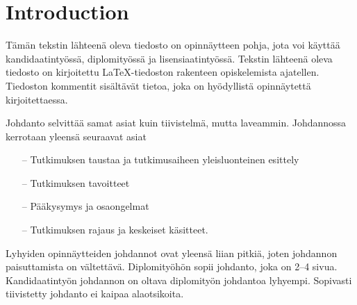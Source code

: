 \documentclass[english,12pt,a4paper,dvips]{article}
\begin{document}
\section{Introduction}

\thispagestyle{empty}

Tämän tekstin lähteenä oleva tiedosto on opinnäytteen
pohja, jota voi käyttää kandidaatintyössä, diplomityössä ja
lisensiaatintyössä. Tekstin 
lähteenä oleva tiedosto on kirjoitettu  \LaTeX-tiedoston rakenteen
opiskelemista ajatellen. Tiedoston kommentit sisältävät
tietoa, joka on hyödyllistä opinnäytettä kirjoitettaessa. 

Johdanto selvittää samat asiat kuin tiivistelmä, mutta
laveammin. Johdannossa kerrotaan yleensä seuraavat asiat

\begin{itemize}
\item[--]Tutkimuksen taustaa ja tutkimusaiheen yleisluonteinen esittely
\item[--]Tutkimuksen tavoitteet
\item[--]Pääkysymys ja osaongelmat
\item[--]Tutkimuksen rajaus ja keskeiset käsitteet.
\end{itemize}

Lyhyiden opinnäytteiden johdannot ovat yleensä liian pitkiä, joten
johdannon paisuttamista on vältettävä. Diplomityöhön sopii johdanto,
joka on 2--4 sivua. %
Kandidaatintyön johdannon on oltava diplomityön
johdantoa lyhyempi. Sopivasti tiivistetty johdanto ei kaipaa alaotsikoita.


\clearpage

\end{document}
